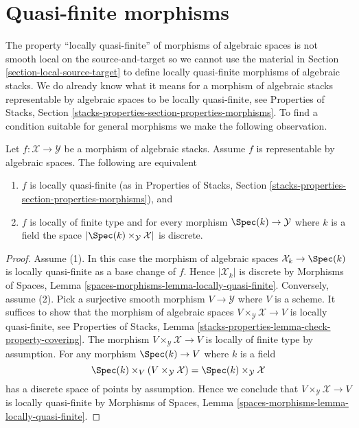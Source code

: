 \section{Quasi-finite morphisms}
\label{section-quasi-finite}

\noindent
The property ``locally quasi-finite'' of morphisms of algebraic spaces
is not smooth local on the source-and-target so we cannot use the material in
Section \ref{section-local-source-target}
to define locally quasi-finite morphisms of algebraic stacks.
We do already know what it means for a morphism of algebraic stacks
representable by algebraic spaces to be locally quasi-finite, see
Properties of Stacks, Section
\ref{stacks-properties-section-properties-morphisms}.
To find a condition suitable for general morphisms we make the following
observation.

\begin{lemma}
\label{lemma-representable-by-spaces-quasi-finite}
Let $f : \mathcal{X} \to \mathcal{Y}$ be a morphism of algebraic stacks.
Assume $f$ is representable by algebraic spaces.
The following are equivalent
\begin{enumerate}
\item $f$ is locally quasi-finite (as in Properties of Stacks,
Section \ref{stacks-properties-section-properties-morphisms}), and
\item $f$ is locally of finite type and for every morphism
$\Spec(k) \to \mathcal{Y}$ where $k$ is a field the
space $|\Spec(k) \times_\mathcal{Y} \mathcal{X}|$ is discrete.
\end{enumerate}
\end{lemma}

\begin{proof}
Assume (1). In this case the morphism of algebraic spaces
$\mathcal{X}_k \to \Spec(k)$ is locally quasi-finite as a base change
of $f$. Hence $|\mathcal{X}_k|$ is discrete by
Morphisms of Spaces, Lemma \ref{spaces-morphisms-lemma-locally-quasi-finite}.
Conversely, assume (2). Pick a surjective smooth morphism
$V \to \mathcal{Y}$ where $V$ is a scheme. It suffices to show that the
morphism of algebraic spaces $V \times_\mathcal{Y} \mathcal{X} \to V$
is locally quasi-finite, see
Properties of Stacks, Lemma
\ref{stacks-properties-lemma-check-property-covering}.
The morphism $V \times_\mathcal{Y} \mathcal{X} \to V$ is locally of finite
type by assumption. For any morphism $\Spec(k) \to V$ where $k$ is a
field
$$
\Spec(k) \times_V (V \times_\mathcal{Y} \mathcal{X}) =
\Spec(k) \times_\mathcal{Y} \mathcal{X}
$$
has a discrete space of points by assumption. Hence we conclude that
$V \times_\mathcal{Y} \mathcal{X} \to V$ is locally quasi-finite by
Morphisms of Spaces, Lemma \ref{spaces-morphisms-lemma-locally-quasi-finite}.
\end{proof}

